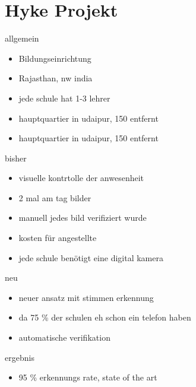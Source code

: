 \section{Hyke Projekt}
\label{hyke}

 




allgemein
\begin{itemize}
	\item Bildungseinrichtung
	\item Rajasthan, nw india
	\item jede schule hat 1-3 lehrer
	\item hauptquartier in udaipur, 150 entfernt
	\item hauptquartier in udaipur, 150 entfernt
\end{itemize}


bisher
\begin{itemize}
	\item visuelle kontrtolle der anwesenheit
	\item 2 mal am tag bilder
	\item manuell jedes bild verifiziert wurde
	\item kosten für angestellte
	\item jede schule benötigt eine digital kamera
\end{itemize}

neu
\begin{itemize}
	\item neuer ansatz mit stimmen erkennung
	\item da 75 \% der schulen eh schon ein telefon haben
	\item automatische verifikation
\end{itemize}


ergebnis
\begin{itemize}
	\item 95 \% erkennungs rate, state of the art
\end{itemize}